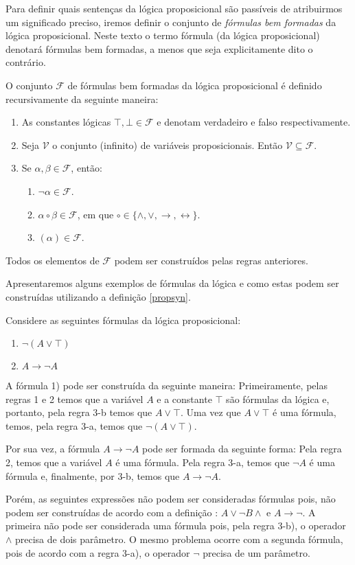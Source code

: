 Para definir quais senten\c{c}as da l\'ogica proposicional s\~ao pass\'iveis de atribuirmos um significado preciso, iremos definir o conjunto
de \textit{f\'ormulas bem formadas} da l\'ogica proposicional. Neste texto o termo f\'ormula (da l\'ogica proposicional) denotar\'a f\'ormulas
bem formadas, a menos que seja explicitamente dito o contr\'ario.

\begin{Definition}\label{propsyn}
O conjunto $\mathcal{F}$ de f\'ormulas bem formadas da l\'ogica proposicional \'e definido recursivamente da seguinte maneira:
\begin{enumerate}
  \item As constantes l\'ogicas $\top,\bot \in \mathcal{F}$ e denotam verdadeiro e falso respectivamente.
  \item Seja $\mathcal{V}$ o conjunto (infinito) de vari\'aveis proposicionais. Ent\~ao $\mathcal{V} \subseteq \mathcal{F}$.
  \item Se $\alpha,\beta \in \mathcal{F}$, ent\~ao:
  \begin{enumerate}
    \item $\neg \alpha \in \mathcal{F}$.
    \item $\alpha \circ \beta \in \mathcal{F}$, em que $\circ \in \{\land,\lor,\to,\leftrightarrow\}$.
    \item $(\alpha)\in\mathcal{F}$.
  \end{enumerate}
\end{enumerate}
Todos os elementos de $\mathcal{F}$ podem ser constru\'idos pelas regras anteriores.
\end{Definition}
Apresentaremos alguns exemplos de f\'ormulas da l\'ogica e como estas
podem ser constru\'idas utilizando a defini\c{c}\~ao \ref{propsyn}.
\begin{Example}
Considere as seguintes fórmulas da lógica proposicional:
\begin{enumerate}
  \item $\neg (A \lor \top)$
  \item $A \to \neg A$
\end{enumerate}
A f\'ormula 1) pode ser constru\'ida da seguinte maneira:
Primeiramente, pelas regras 1 e 2 temos que a vari\'avel $A$ e a
constante $\top$ s\~ao f\'ormulas da lógica e, portanto, pela regra
3-b temos que $A \lor \top$. Uma vez que $A \lor \top$ \'e uma
f\'ormula, temos, pela regra 3-a, temos que $\neg (A \lor \top)$.

Por sua vez, a f\'ormula $A \to \neg A$ pode ser formada da seguinte
forma: Pela regra 2, temos que a vari\'avel $A$ \'e uma
f\'ormula. Pela regra 3-a, temos que $\neg A$ \'e uma f\'ormula e,
finalmente, por 3-b, temos que $A \to \neg A$.

Por\'em, as seguintes express\~oes n\~ao podem ser consideradas
f\'ormulas pois, n\~ao podem ser constru\'idas de acordo com a
defini\c{c}\~ao \label{propsyn}: $A \lor \neg B \land$ e $A \to
\neg$. A primeira n\~ao pode ser considerada uma f\'ormula pois,
pela regra 3-b), o operador $\land$ precisa de dois par\^ametro. O
mesmo problema ocorre com a segunda f\'ormula, pois de acordo com
a regra 3-a), o operador $\neg$ precisa de um par\^ametro.
\end{Example}

